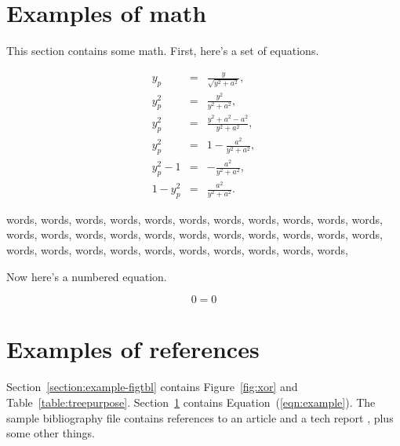 \section{Examples of math}
\label{section:example-math}

This section contains some math.
First, here's a set of equations.

\begin{eqnarray*}
y_p	&	=	&	\frac{y}{\sqrt{y^2+a^2}}, \\
y_p^2	&	=	&	\frac{y^2}{y^2+a^2}, \\
y_p^2	&	=	&	\frac{y^2+a^2-a^2}{y^2+a^2}, \\
y_p^2	&	=	&	1-\frac{a^2}{y^2+a^2}, \\
y_p^2-1	&	=	&	-\frac{a^2}{y^2+a^2}, \\
1-y_p^2	&	=	&	\frac{a^2}{y^2+a^2}.
\end{eqnarray*}

words, words, words, words,
words, words, words, words,
words, words, words, words,
words, words, words, words,
words, words, words, words,
words, words, words, words,
words, words, words, words,
words, words, words, words,

Now here's a numbered equation.

\begin{equation}
0 = 0 \label{eqn:example}
\end{equation}

\section{Examples of references}

Section~\ref{section:example-figtbl} contains 
Figure~\ref{fig:xor} and
Table~\ref{table:treepurpose}.
Section~\ref{section:example-math} contains
Equation~(\ref{eqn:example}).
The sample bibliography file contains references to
an article \cite{pc} and a tech report \cite{opandfunc}, plus some
other things.
\nocite{dph}
